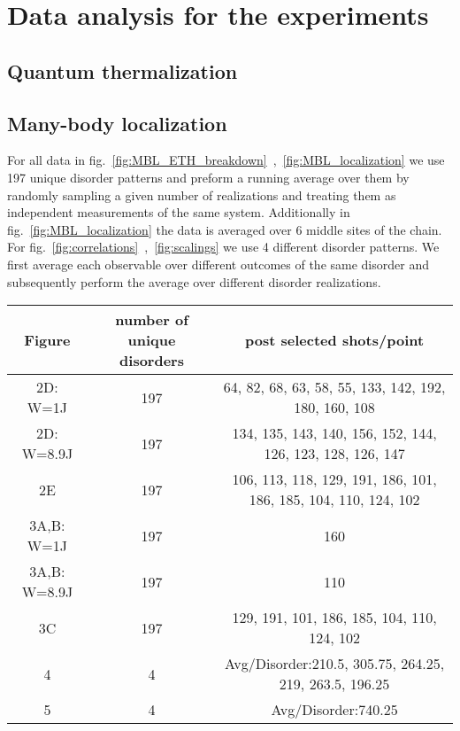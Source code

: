 \chapter{Data analysis for the experiments}
\label{AppendixB}

\section{Quantum thermalization}


\section{Many-body localization}
For all data in fig.~\ref{fig:MBL_ETH_breakdown}~,~\ref{fig:MBL_localization} we use 197 unique disorder patterns and preform a running average over them by randomly sampling a given number of realizations and treating them as independent measurements of the same system. Additionally in fig.~\ref{fig:MBL_localization} the data is averaged over 6 middle sites of the chain. For fig.~\ref{fig:correlations}~,~\ref{fig:scalings} we use 4 different disorder patterns. We first average each observable over different outcomes of the same disorder and subsequently perform the average over different disorder realizations. 

\begin{center}
	\begin{tabular}{|c|c|c|}
		\hline Figure & number of unique disorders & post selected shots/point\\
		\hline 2D: W=1J & 197 & 64, 82, 68, 63, 58, 55, 133, 142, 192, 180, 160, 108\\ 
		\hline 2D: W=8.9J & 197 & 134, 135, 143, 140, 156, 152, 144, 126, 123, 128, 126, 147 \\ 
		\hline 2E & 197 & 106, 113, 118, 129, 191, 186, 101, 186, 185, 104, 110, 124, 102 \\ 
		\hline 3A,B: W=1J & 197 & 160\\ 
		\hline 3A,B: W=8.9J & 197 & 110 \\ 
		\hline 3C & 197 & 129, 191, 101, 186, 185, 104, 110, 124, 102 \\ 
		\hline 4 & 4 & Avg/Disorder:210.5, 305.75, 264.25, 219, 263.5, 196.25\\
		\hline 5 & 4 & Avg/Disorder:740.25\\
		\hline
	\end{tabular} 
\end{center}